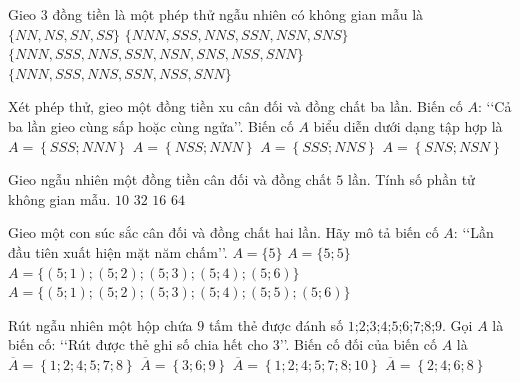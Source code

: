 \begin{ex}%
	Gieo $3$ đồng tiền là một phép  thử ngẫu nhiên có không gian mẫu là
	 \choice
		 {$\{NN,NS,SN,SS\}$}
		 {$\{NNN,SSS,NNS,SSN,NSN,SNS\}$}
		{\True $\{NNN,SSS,NNS,SSN,NSN,SNS,NSS,SNN\}$} 
		 {$\{NNN,SSS,NNS,SSN,NSS,SNN\}$}
\end{ex}

\begin{ex}%
	Xét phép thử, gieo một đồng tiền xu cân đối và đồng  chất ba lần. Biến cố $A$: \lq\lq Cả ba lần gieo cùng sấp hoặc cùng ngửa\rq\rq. Biến cố $A$ biểu diễn dưới dạng tập hợp là
	\choice 
		 {\True $A=\left\{SSS;NNN \right\}$}
		 {$A=\left\{NSS;NNN \right\}$}
		 {$A=\left\{SSS;NNS \right\}$}
		{$A=\left\{SNS;NSN  \right\}$}
\end{ex}

\begin{ex}%
	Gieo ngẫu nhiên một đồng tiền cân đối và đồng chất $5$ lần. Tính số phần tử  không gian mẫu.
	\choice 
		 {$10$}
		{\True  $32$}
		{$16$} 
		 {$64$}
\end{ex}

\begin{ex}%
	Gieo một con súc sắc cân đối và đồng chất hai lần. Hãy mô tả biến cố $A$: \lq\lq Lần  đầu tiên xuất hiện mặt năm chấm\rq\rq.
	 \choice
		 {$A=\{5\}$}
		 {$A=\{5;5\}$}
		 {$A=\{(5;1);(5;2);(5;3);(5;4);(5;6)\}$}
		 {\True $A=\{(5;1);(5;2);(5;3);(5;4);(5;5);(5;6)\}$}
\end{ex}

\begin{ex}%
	Rút ngẫu nhiên một hộp chứa $9$ tấm thẻ được đánh số $1$;$2$;$3$;$4$;$5$;$6$;$7$;$8$;$9$. Gọi $A$ là biến cố: \lq\lq Rút được thẻ ghi số chia  hết cho 3\rq\rq. Biến cố đối của biến cố $A$ là
	 \choice
		{\True $\overline{A} =  \left\lbrace 1;2;4;5;7;8\right\rbrace $}
		{$\overline{A} = \left\lbrace 3;6;9\right\rbrace  $}
		{$\overline{A} = \left\lbrace 1;2;4;5;7;8;10\right\rbrace $} 
		{$\overline{A} = \left\lbrace 2;4;6;8\right\rbrace $} 
\end{ex}

